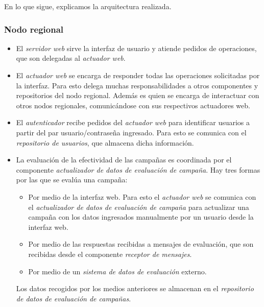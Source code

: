 \documentclass[a4paper, 10pt, twoside]{article}
\begin{document}
En lo que sigue, explicamos la arquitectura realizada.

\subsubsection{Nodo regional}

\begin{itemize}
  \item El \textit{servidor web} sirve la interfaz de usuario y atiende pedidos de operaciones, que son delegadas al \textit{actuador web}.

  \item El \textit{actuador web} se encarga de responder todas las operaciones solicitadas por la interfaz. Para esto delega muchas responsabilidades a otros componentes y repositorios del nodo regional. Además es quien se encarga de interactuar con otros nodos regionales, comunicándose con sus respectivos actuadores web.

  \item El \textit{autenticador} recibe pedidos del \textit{actuador web} para identificar usuarios a partir del par usuario/contraseña ingresado. Para esto se comunica con el \textit{repositorio de usuarios}, que almacena dicha información.

  \item La evaluación de la efectividad de las campañas es coordinada por el componente \textit{actualizador de datos de evaluación de campaña}. Hay tres formas por las que se evalúa una campaña:

  \begin{itemize}
    \item Por medio de la interfaz web. Para esto el \textit{actuador web} se comunica con el \textit{actualizador de datos de evaluación de campaña} para actualizar una campaña con los datos ingresados manualmente por un usuario desde la interfaz web.

    \item Por medio de las respuestas recibidas a mensajes de evaluación, que son recibidas desde el componente \textit{receptor de mensajes}.

    \item Por medio de un \textit{sistema de datos de evaluación} externo.
  \end{itemize}

  Los datos recogidos por los medios anteriores se almacenan en el \textit{repositorio de datos de evaluación de campañas}.


\end{itemize}
\end{document}
